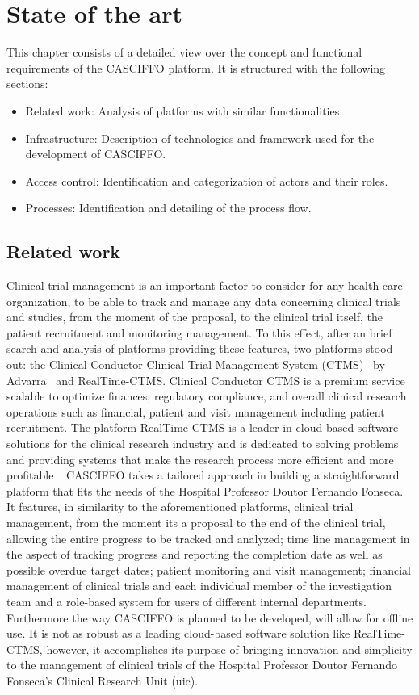 % 
%
\chapter{State of the art}\label{ch:state-of-the-art}

This chapter consists of a detailed view over the concept and functional requirements of the CASCIFFO platform.
It is structured with the following sections:
\begin{itemize}
    \item Related work: Analysis of platforms with similar functionalities.
    \item Infrastructure: Description of technologies and framework used for the development of CASCIFFO. 
    \item Access control: Identification and categorization of actors and their roles.
    \item Processes: Identification and detailing of the process flow.
\end{itemize}

\section{Related work}
Clinical trial management is an important factor to consider for any health care organization, to be able to track and manage any data concerning clinical trials and studies, from the moment of the proposal, to the clinical trial itself, the patient recruitment and monitoring management. To this effect, after an brief search and analysis of platforms providing these features, two platforms stood out: the Clinical Conductor Clinical Trial Management System (CTMS)~\cite{clinical-conductor-ctms} by Advarra~\cite{Advarra} and RealTime-CTMS. Clinical Conductor CTMS is a premium service scalable to optimize finances, regulatory compliance, and overall clinical research operations such as financial, patient and visit management including patient recruitment. The platform RealTime-CTMS is a leader in cloud-based software solutions for the clinical research industry and is dedicated to solving problems and providing systems that make the research process more efficient and more profitable~\cite{realtime-ctms}.
CASCIFFO takes a tailored approach in building a straightforward platform that fits the needs of the Hospital Professor Doutor Fernando Fonseca. It features, in similarity to the aforementioned platforms, clinical trial management, from the moment its a proposal to the end of the clinical trial, allowing the entire progress to be tracked and analyzed; time line management in the aspect of tracking progress and reporting the completion date as well as possible overdue target dates; patient monitoring and visit management; financial management of clinical trials and each individual member of the investigation team and a role-based system for users of different internal departments. Furthermore the way CASCIFFO is planned to be developed, will allow for offline use. It is not as robust as a leading cloud-based software solution like RealTime-CTMS, however, it accomplishes its purpose of bringing innovation and simplicity to the management of clinical trials of the Hospital Professor Doutor Fernando Fonseca's Clinical Research Unit (\acrlong{uic}).

